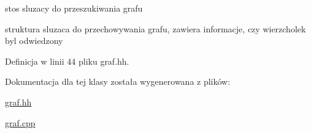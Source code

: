 stos sluzacy do przeszukiwania grafu 

struktura sluzaca do przechowywania grafu, zawiera informacje, czy wierzcholek byl odwiedzony 

Definicja w linii 44 pliku graf.\-hh.



Dokumentacja dla tej klasy została wygenerowana z plików\-:\begin{DoxyCompactItemize}
\item 
\hyperlink{graf_8hh}{graf.\-hh}\item 
\hyperlink{graf_8cpp}{graf.\-cpp}\end{DoxyCompactItemize}
